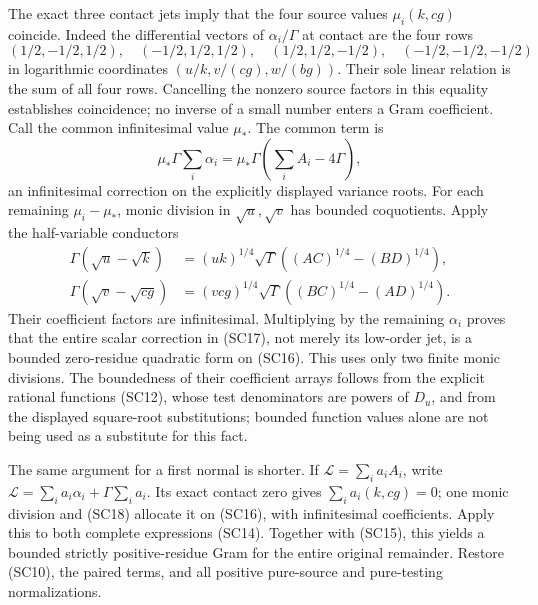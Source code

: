 The exact three contact jets imply that the four source values
$\mu_i(k,cg)$ coincide. Indeed the differential vectors of
$\alpha_i/\Gamma$ at contact are the four rows
\[
 (1/2,-1/2,1/2),\quad(-1/2,1/2,1/2),\quad
 (1/2,1/2,-1/2),\quad(-1/2,-1/2,-1/2)
\]
in logarithmic coordinates $(u/k,v/(cg),w/(bg))$. Their sole linear
relation is the sum of all four rows. Cancelling the nonzero source
factors in this equality establishes coincidence; no inverse of a
small number enters a Gram coefficient.
Call the common infinitesimal value $\mu_*$. The common term is
\[
 \mu_*\Gamma\sum_i\alpha_i
   =\mu_*\Gamma\left(\sum_iA_i-4\Gamma\right),
\]
an infinitesimal correction on the explicitly displayed variance roots.
For each remaining $\mu_i-\mu_*$, monic division in $\sqrt u,\sqrt v$
has bounded coquotients. Apply the half-variable conductors
\[
\begin{aligned}
 \Gamma(\sqrt u-\sqrt k)
   &=(uk)^{1/4}\sqrt\Gamma
          ((AC)^{1/4}-(BD)^{1/4}),\\
 \Gamma(\sqrt v-\sqrt{cg})
   &=(vcg)^{1/4}\sqrt\Gamma
          ((BC)^{1/4}-(AD)^{1/4}).
\end{aligned}                                                     \tag{SC20}
\]
Their coefficient factors are infinitesimal. Multiplying by the
remaining $\alpha_i$ proves that the entire scalar correction in
(SC17), not merely its low-order jet, is a bounded zero-residue
quadratic form on (SC16). This uses only two finite monic divisions.
The boundedness of their coefficient arrays follows from the explicit
rational functions (SC12), whose test denominators are powers of
$D_u$, and from the displayed square-root substitutions; bounded
function values alone are not being used as a substitute for this fact.

The same argument for a first normal is shorter. If
$\mathcal L=\sum_i a_iA_i$, write
$\mathcal L=\sum_i a_i\alpha_i+\Gamma\sum_i a_i$.
Its exact contact zero gives $\sum_i a_i(k,cg)=0$; one monic division
and (SC18) allocate it on (SC16), with infinitesimal coefficients.
Apply this to both complete expressions (SC14).
Together with (SC15), this yields a bounded strictly positive-residue
Gram for the entire original remainder. Restore (SC10), the paired
terms, and all positive pure-source and pure-testing normalizations.

